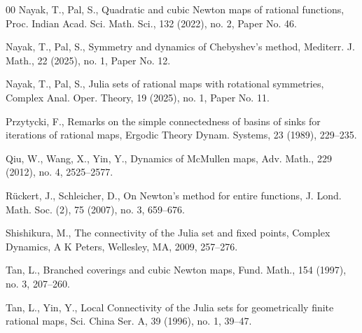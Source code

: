 \documentclass[12pt]{article}
\numberwithin{equation}{section}
\begin{document}
\begin{thebibliography}{00}
   Nayak, T., Pal, S., Quadratic and cubic Newton maps of rational functions, Proc. Indian Acad. Sci. Math. Sci., 132 (2022), no. 2, Paper No. 46.
	
   Nayak, T., Pal, S., Symmetry and dynamics of Chebyshev's method, Mediterr. J. Math., 22 (2025), no. 1, Paper No. 12.
	
   Nayak, T., Pal, S., Julia sets of rational maps with rotational symmetries, Complex Anal. Oper. Theory, 19 (2025), no. 1, Paper No. 11.

  	Przytycki, F., Remarks on the simple connectedness of basins of sinks for iterations of rational maps, Ergodic Theory Dynam. Systems, 23 (1989), 229--235.

   Qiu, W., Wang, X., Yin, Y., Dynamics of McMullen maps, Adv. Math., 229 (2012), no. 4, 2525--2577.

   R\"uckert, J., Schleicher, D., On Newton's method for entire functions, J. Lond. Math. Soc. (2),  75 (2007), no. 3, 659--676.
	
   Shishikura, M., The connectivity of the Julia set and fixed points, Complex Dynamics, A K Peters, Wellesley, MA, 2009, 257--276.	
  
   Tan, L., Branched coverings and cubic Newton maps, Fund. Math., 154 (1997), no. 3, 207--260.

   Tan, L., Yin, Y., Local Connectivity of the Julia sets for geometrically finite rational maps, Sci. China Ser. A, 39 (1996), no. 1, 39--47.


\end{thebibliography}
\end{document}
